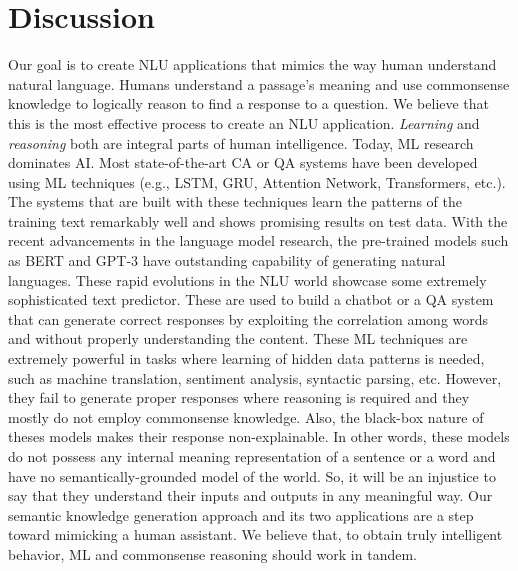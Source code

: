 \documentclass[letterpaper]{article}
\begin{document}
\vspace{-3.32mm}
\section{Discussion}

Our goal is to create NLU applications that mimics the way human understand natural language. Humans understand a passage's meaning and use commonsense knowledge to logically reason to find a response to a question. We believe that this is the most effective process to create an NLU application. \textit{Learning} and \textit{reasoning} both are integral parts of human intelligence. Today, ML research dominates AI. Most state-of-the-art CA or QA systems have been developed using ML techniques (e.g., LSTM, GRU, Attention Network, Transformers, etc.). The systems that are built with these  techniques learn the patterns of the training text remarkably well and shows promising results on test data. With the recent advancements in the language model research, the pre-trained models such as BERT \cite{bert} and GPT-3 \cite{gpt3} have outstanding capability of generating natural languages. These rapid evolutions in the NLU world showcase some extremely sophisticated text predictor. These are used to build a chatbot or a QA system that can generate correct responses by exploiting the correlation among words and without properly understanding the content. These ML techniques are extremely powerful in tasks where learning of hidden data patterns is needed, such as machine translation, sentiment analysis, syntactic parsing, etc. However, they fail to generate proper responses where reasoning is required and they mostly do not employ commonsense knowledge. Also, the black-box nature of theses models makes their response non-explainable. In other words, these models do not possess any internal meaning representation of a sentence or a word and have no semantically-grounded model of the world. So, it will be an injustice to say that they understand their inputs and outputs in any meaningful way. Our semantic knowledge generation approach and its two applications are a step toward mimicking a human assistant. We believe that, to obtain truly intelligent behavior, ML and commonsense reasoning should work in tandem.
\end{document}
